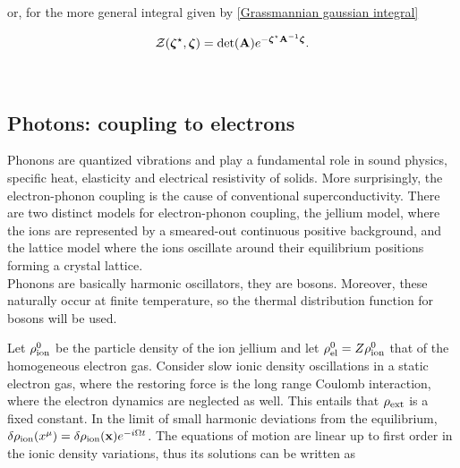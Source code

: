 or, for the more general integral given by \cref{Grassmannian gaussian integral}

\begin{equation}
    \mathcal{Z}(\bm{\zeta}^\star,\bm{\zeta}) = \det(\bf A) e^{-\bm{\zeta}^\star {\bf A}^{-1} \bm{\zeta}}. 
\end{equation}

\blanky \\

\subsection{Photons: coupling to electrons}

Phonons are quantized vibrations and play a fundamental role in sound physics, specific heat, elasticity and electrical resistivity of solids. More surprisingly, the electron-phonon coupling is the cause of conventional superconductivity. There are two distinct models for electron-phonon coupling, the jellium model, where the ions are represented by a smeared-out continuous positive background, and the lattice model where the ions oscillate around their equilibrium positions forming a crystal lattice. \\

Phonons are basically harmonic oscillators, they are bosons. Moreover, these naturally occur at finite temperature, so the thermal distribution function for bosons will be used. \\

\iffalse

Let $\rho^0_{\textnormal{ion}}$ be the particle density of the ion jellium and let $\rho^0_{\textnormal{el}} = Z \rho^0_{\textnormal{ion}}$ that of the homogeneous electron gas. Consider slow ionic density oscillations in a static electron gas, where the restoring force is the long range Coulomb interaction, where the electron dynamics are neglected as well. This entails that $\rho_{\textnormal{ext}}$ is a fixed constant. In the limit of small harmonic deviations from the equilibrium, $\delta \rho_{\textnormal{ion}}(x^\mu) = \delta \rho_{\textnormal{ion}} ({\bf x}) e^{-i\Omega t}$. The equations of motion are linear up to first order in the ionic density variations, thus its solutions can be written as 

